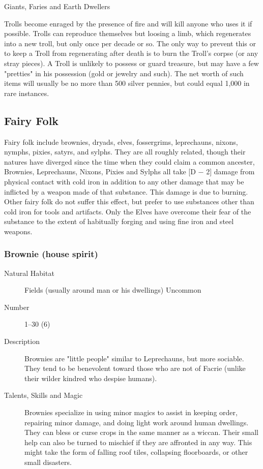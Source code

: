 \begin{mmgroup}{Giants, Faries and Earth Dwellers}
\begin{mmcomment}
 Trolls become enraged by the presence of fire and will kill
anyone who uses it if possible. Trolls can reproduce themselves but
loosing a limb, which regenerates into a new troll, but only once per
decade or so.  The only way to prevent this or to keep a Troll from
regenerating after death is to burn the Troll's corpse (or any stray
pieces).  A Troll is unlikely to possess or guard treasure, but may
have a few "pretties" in his possession (gold or jewelry and such).
The net worth of such items will usually be no more than 500 silver
pennies, but could equal 1,000 in rare instances.

\end{mmcomment}

\subsection{Fairy Folk}
Fairy folk include brownies, dryads, elves, fossergrims, leprechauns,
nixons, nymphs, pixies, satyrs, and sylphs.  They are all roughly
related, though their natures have diverged since the time when they
could claim a common ancester, Brownies, Leprechauns, Nixons, Pixies
and Sylphs all take [D − 2] damage from physical contact with cold
iron in addition to any other damage that may be inflicted by a weapon
made of that substance.  This damage is due to burning. Other fairy
folk do not suffer this effect, but prefer to use substances other
than cold iron for tools and artifacts. Only the Elves have overcome
their fear of the substance to the extent of habitually forging and
using fine iron and steel weapons.

\subsubsection{Brownie (house spirit)}

\begin{description}
\item[Natural Habitat] Fields (usually around man or his dwellings) Uncommon

\item[Number] 1–30 (6)

\item[Description] Brownies are "little people" similar to Leprechauns, but
more sociable. They tend to be benevolent toward those who are not of
Facrie (unlike their wilder kindred who despise humans).

\item[Talents, Skills and Magic] Brownies specialize in using minor magics to assist in
keeping order, repairing minor damage, and doing light work around
human dwellings. They can bless or curse crops in the same manner as a
wiccan. Their small help can also be turned to mischief if they are
affronted in any way. This might take the form of falling roof tiles,
collapsing floorboards, or other small disasters.


\end{description}
\end{mmgroup}
